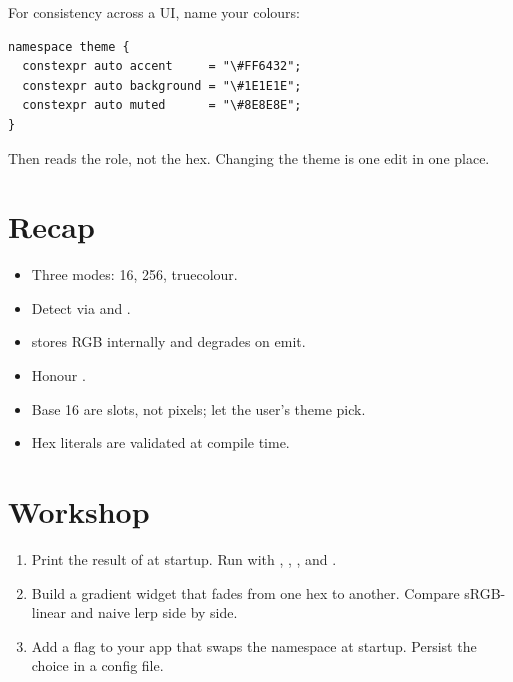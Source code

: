 For consistency across a UI, name your colours:

\begin{lstlisting}
namespace theme {
  constexpr auto accent     = "\#FF6432";
  constexpr auto background = "\#1E1E1E";
  constexpr auto muted      = "\#8E8E8E";
}
\end{lstlisting}

Then  reads the role, not the hex.
Changing the theme is one edit in one place.

\section{Recap}

\begin{recap}
\begin{itemize}[leftmargin=*]
  \item Three modes: 16, 256, truecolour.
  \item Detect via  and .
  \item \maya{} stores RGB internally and degrades on emit.
  \item Honour .
  \item Base 16 are slots, not pixels; let the user's theme
    pick.
  \item Hex literals are validated at compile time.
\end{itemize}
\end{recap}

\section*{Workshop}

\begin{enumerate}[leftmargin=*]
  \item Print the result of  at
    startup. Run with , ,
    , and .
  \item Build a gradient widget that fades from one hex to
    another. Compare sRGB-linear and naive lerp side by side.
  \item Add a  flag to your app that swaps the
     namespace at startup. Persist the choice in
    a config file.
\end{enumerate}
